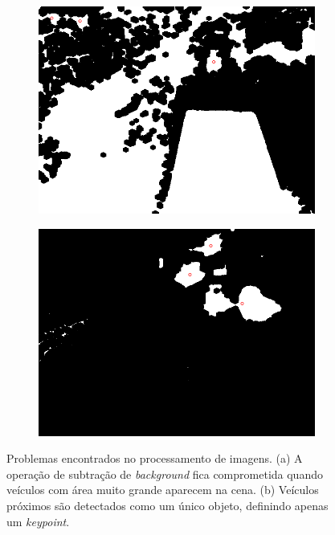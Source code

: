 \begin{figure}[ht]
  \begin{center}
    \begin{subfigure}[b]{.49\textwidth}
      \begin{center}
        \includegraphics[width=1\linewidth]{imgs/problema_veiculo_grande.png}
      \end{center}
      \caption{}
      \label{fig:problema_veiculo_grande}
    \end{subfigure}
    \begin{subfigure}[b]{.49\textwidth}
      \begin{center}
        \includegraphics[width=1\linewidth]{imgs/problema_veiculo_junto.png}
      \end{center}
      \caption{}
      \label{fig:problema_veiculo_junto}
    \end{subfigure}
  \end{center}
  \caption{Problemas encontrados no processamento de imagens. (a) A operação de subtração de \textit{background} fica comprometida quando veículos com área muito grande aparecem na cena. (b) Veículos próximos são detectados como um único objeto, definindo apenas um \textit{keypoint}.}
  \label{fig:problemas}
\end{figure}

